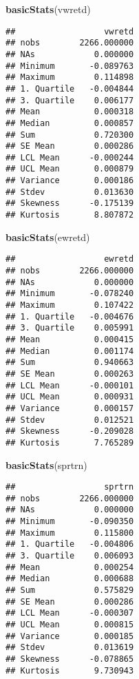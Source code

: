\documentclass[
]{article}
\newenvironment{Shaded}{\begin{snugshade}}{\end{snugshade}}
\newcommand{\FunctionTok}[1]{\textcolor[rgb]{0.13,0.29,0.53}{\textbf{#1}}}
\newcommand{\NormalTok}[1]{#1}
\begin{document}
\begin{Shaded}
\begin{Highlighting}[]
\FunctionTok{basicStats}\NormalTok{(vwretd)}
\end{Highlighting}
\end{Shaded}

\begin{verbatim}
##                  vwretd
## nobs        2266.000000
## NAs            0.000000
## Minimum       -0.089763
## Maximum        0.114898
## 1. Quartile   -0.004844
## 3. Quartile    0.006177
## Mean           0.000318
## Median         0.000857
## Sum            0.720300
## SE Mean        0.000286
## LCL Mean      -0.000244
## UCL Mean       0.000879
## Variance       0.000186
## Stdev          0.013630
## Skewness      -0.175139
## Kurtosis       8.807872
\end{verbatim}

\begin{Shaded}
\begin{Highlighting}[]
\FunctionTok{basicStats}\NormalTok{(ewretd)}
\end{Highlighting}
\end{Shaded}

\begin{verbatim}
##                  ewretd
## nobs        2266.000000
## NAs            0.000000
## Minimum       -0.078240
## Maximum        0.107422
## 1. Quartile   -0.004676
## 3. Quartile    0.005991
## Mean           0.000415
## Median         0.001174
## Sum            0.940663
## SE Mean        0.000263
## LCL Mean      -0.000101
## UCL Mean       0.000931
## Variance       0.000157
## Stdev          0.012521
## Skewness      -0.209028
## Kurtosis       7.765289
\end{verbatim}

\begin{Shaded}
\begin{Highlighting}[]
\FunctionTok{basicStats}\NormalTok{(sprtrn)}
\end{Highlighting}
\end{Shaded}

\begin{verbatim}
##                  sprtrn
## nobs        2266.000000
## NAs            0.000000
## Minimum       -0.090350
## Maximum        0.115800
## 1. Quartile   -0.004806
## 3. Quartile    0.006093
## Mean           0.000254
## Median         0.000688
## Sum            0.575829
## SE Mean        0.000286
## LCL Mean      -0.000307
## UCL Mean       0.000815
## Variance       0.000185
## Stdev          0.013619
## Skewness      -0.078865
## Kurtosis       9.730943
\end{verbatim}
\end{document}

